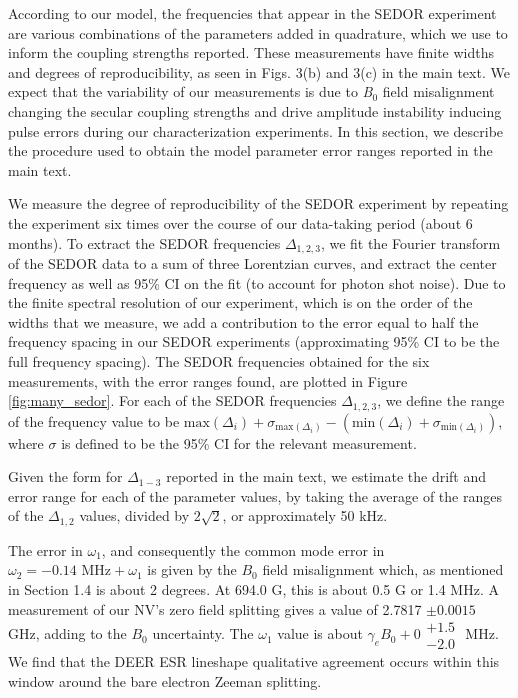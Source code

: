 \documentclass[%
 reprint,
 amsmath,amssymb,
 aps,
]{revtex4-1}
\begin{document}
According to our model, the frequencies that appear in the SEDOR experiment are various combinations of the parameters added in quadrature, which we use to inform the coupling strengths reported. These measurements have finite widths and degrees of reproducibility, as seen in Figs. 3(b) and 3(c) in the main text. We expect that the variability of our measurements is due to \textit{B}$_0$ field misalignment changing the secular coupling strengths and drive amplitude instability inducing pulse errors during our characterization experiments. In this section, we describe the procedure used to obtain the model parameter error ranges reported in the main text. 

We measure the degree of reproducibility of the SEDOR experiment by repeating the experiment six times over the course of our data-taking period (about 6 months). To extract the SEDOR frequencies $\Delta_{1,2,3}$, we fit the Fourier transform of the SEDOR data to a sum of three Lorentzian curves, and extract the center frequency as well as 95\% CI on the fit (to account for photon shot noise). Due to the finite spectral resolution of our experiment, which is on the order of the widths that we measure, we add a contribution to the error equal to half the frequency spacing in our SEDOR experiments (approximating 95\% CI to be the full frequency spacing). The SEDOR frequencies obtained for the six measurements, with the error ranges found, are plotted in Figure \ref{fig:many_sedor}. For each of the SEDOR frequencies $\Delta_{1,2,3}$, we define the range of the frequency value to be $\text{max}(\Delta_i) + \sigma_{\text{max}(\Delta_i)} - (\text{min}(\Delta_i) + \sigma_{\text{min}(\Delta_i)})$, where $\sigma$ is defined to be the 95\% CI for the relevant measurement. 

Given the form for $\Delta_{1-3}$ reported in the main text, we estimate the drift and error range for each of the parameter values, by taking the average of the ranges of the $\Delta_{1,2}$ values, divided by $2\sqrt{2}$, or approximately 50 kHz.

The error in $\omega_1$, and consequently the common mode error in $\omega_2 = -0.14 \text{ MHz} + \omega_1$ is given by the $B_0$ field misalignment which, as mentioned in Section 1.4 is about 2 degrees. At 694.0 G, this is about 0.5 G or 1.4 MHz. A measurement of our NV's zero field splitting gives a value of 2.7817 $\pm 0.0015$ GHz, adding to the $B_0$ uncertainty. The $\omega_1$ value is about $\gamma_e B_0 +0\substack{+1.5 \\ -2.0} \text{ MHz}$. We find that the DEER ESR lineshape qualitative agreement occurs within this window around the bare electron Zeeman splitting.
\end{document}
